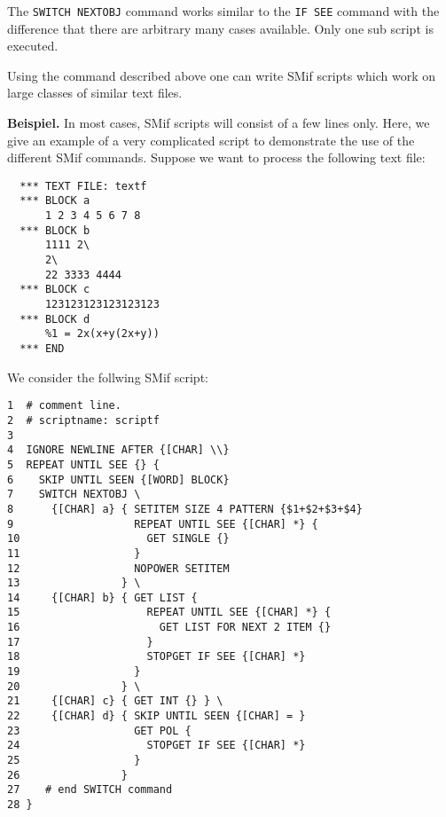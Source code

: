 \documentclass{article}
\begin{document}
The \texttt{SWITCH NEXTOBJ} command works similar to the \texttt{IF
  SEE} command with the difference that there are arbitrary many cases
available. Only one sub script is executed.

Using the command described above one can write SMif scripts which
work on large classes of similar text files.

\textbf{Beispiel.} In most cases, SMif scripts will consist of a few
lines only. Here, we give an example of a very complicated script to
demonstrate the use of the different SMif commands. Suppose we want to
process the following text file:

\begin{verbatim}
  *** TEXT FILE: textf
  *** BLOCK a
      1 2 3 4 5 6 7 8
  *** BLOCK b
      1111 2\
      2\
      22 3333 4444
  *** BLOCK c
      123123123123123123
  *** BLOCK d
      %1 = 2x(x+y(2x+y))
  *** END
\end{verbatim}

We consider the follwing SMif script:

\begin{verbatim}
1  # comment line.
2  # scriptname: scriptf
3  
4  IGNORE NEWLINE AFTER {[CHAR] \\}
5  REPEAT UNTIL SEE {} {
6    SKIP UNTIL SEEN {[WORD] BLOCK}
7    SWITCH NEXTOBJ \
8      {[CHAR] a} { SETITEM SIZE 4 PATTERN {$1+$2+$3+$4}
9                   REPEAT UNTIL SEE {[CHAR] *} {
10                    GET SINGLE {}
11                  }
12                  NOPOWER SETITEM
13                } \
14     {[CHAR] b} { GET LIST {
15                    REPEAT UNTIL SEE {[CHAR] *} {
16                      GET LIST FOR NEXT 2 ITEM {}
17                    } 
18                    STOPGET IF SEE {[CHAR] *}
19                  }
20                } \
21     {[CHAR] c} { GET INT {} } \
22     {[CHAR] d} { SKIP UNTIL SEEN {[CHAR] = }
23                  GET POL {
24                    STOPGET IF SEE {[CHAR] *}
25                  }
26                }
27    # end SWITCH command
28 }
\end{verbatim}
\end{document}
